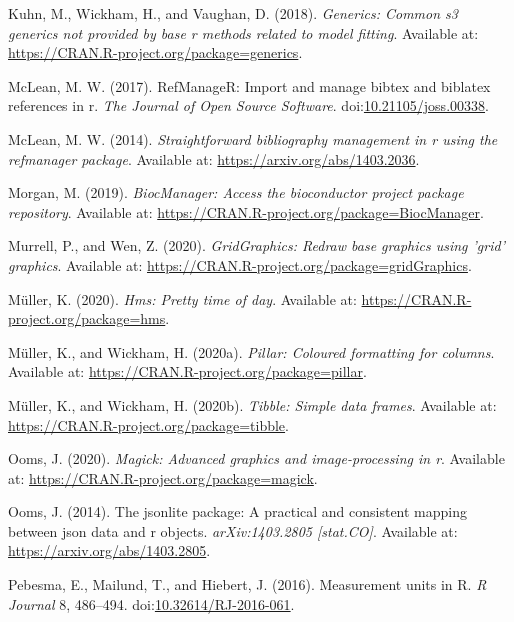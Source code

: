 \documentclass[utf8]{frontiersSCNS}
\newlength{\cslhangindent}
\newenvironment{cslreferences}%
  {\setlength{\parindent}{0pt}%
  \everypar{\setlength{\hangindent}{\cslhangindent}}\ignorespaces}%
  {\par}
\begin{document}
\begin{cslreferences}
\leavevmode\hypertarget{ref-kuhn2018generics}{}%
Kuhn, M., Wickham, H., and Vaughan, D. (2018). \emph{Generics: Common s3
generics not provided by base r methods related to model fitting}.
Available at: \url{https://CRAN.R-project.org/package=generics}.

\leavevmode\hypertarget{ref-mclean2017refmanager}{}%
McLean, M. W. (2017). RefManageR: Import and manage bibtex and biblatex
references in r. \emph{The Journal of Open Source Software}.
doi:\href{https://doi.org/10.21105/joss.00338}{10.21105/joss.00338}.

\leavevmode\hypertarget{ref-mclean2014straightforward}{}%
McLean, M. W. (2014). \emph{Straightforward bibliography management in r
using the refmanager package}. Available at:
\url{https://arxiv.org/abs/1403.2036}.

\leavevmode\hypertarget{ref-morgan2019biocmanager}{}%
Morgan, M. (2019). \emph{BiocManager: Access the bioconductor project
package repository}. Available at:
\url{https://CRAN.R-project.org/package=BiocManager}.

\leavevmode\hypertarget{ref-murrell2020gridgraphics}{}%
Murrell, P., and Wen, Z. (2020). \emph{GridGraphics: Redraw base
graphics using 'grid' graphics}. Available at:
\url{https://CRAN.R-project.org/package=gridGraphics}.

\leavevmode\hypertarget{ref-mller2020pretty}{}%
Müller, K. (2020). \emph{Hms: Pretty time of day}. Available at:
\url{https://CRAN.R-project.org/package=hms}.

\leavevmode\hypertarget{ref-mller2020pillar}{}%
Müller, K., and Wickham, H. (2020a). \emph{Pillar: Coloured formatting
for columns}. Available at:
\url{https://CRAN.R-project.org/package=pillar}.

\leavevmode\hypertarget{ref-mller2020tibble}{}%
Müller, K., and Wickham, H. (2020b). \emph{Tibble: Simple data frames}.
Available at: \url{https://CRAN.R-project.org/package=tibble}.

\leavevmode\hypertarget{ref-ooms2020magick}{}%
Ooms, J. (2020). \emph{Magick: Advanced graphics and image-processing in
r}. Available at: \url{https://CRAN.R-project.org/package=magick}.

\leavevmode\hypertarget{ref-ooms2014jsonlite}{}%
Ooms, J. (2014). The jsonlite package: A practical and consistent
mapping between json data and r objects. \emph{arXiv:1403.2805
{[}stat.CO{]}}. Available at: \url{https://arxiv.org/abs/1403.2805}.

\leavevmode\hypertarget{ref-pebesma2016measurement}{}%
Pebesma, E., Mailund, T., and Hiebert, J. (2016). Measurement units in
R. \emph{R Journal} 8, 486--494.
doi:\href{https://doi.org/10.32614/RJ-2016-061}{10.32614/RJ-2016-061}.


\end{cslreferences}
\end{document}
